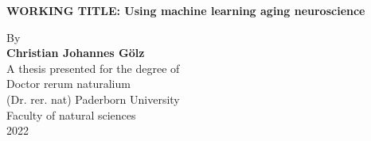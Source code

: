 \begin{titlepage}
    \begin{center}
        \vspace*{1cm}
        \Huge
        \textbf{WORKING TITLE: Using machine learning aging neuroscience}
                        
        \vspace{1.5cm}
        \LARGE
        By\\
        \vspace{0.5cm}
        \textbf{Christian Johannes Gölz\\}
        \vspace{0.5cm}       
        A thesis presented for the degree of\\
        Doctor rerum naturalium\\
        (Dr. rer. nat)
        \vfill
        \Large
        Paderborn University\\
        Faculty of natural sciences\\
        2022
            
    \end{center}
\end{titlepage}

